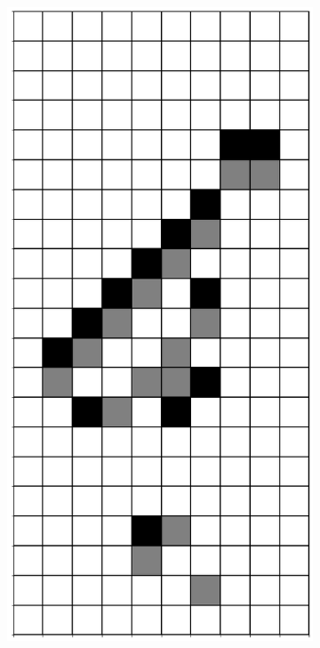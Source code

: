 \documentclass[12pt]{article}
\numberwithin{figure}{section} %
\begin{document}
\begin{figure}[H]
\begin{subfigure}{0.3\textwidth}
     		\subcaption{}
   	\end{subfigure}
        \begin{subfigure}{0.3\textwidth}
     		\centering
     		\includegraphics[angle=270,width=\linewidth]{Section4/23.5}

\end{subfigure}
\end{figure}
\end{document}
